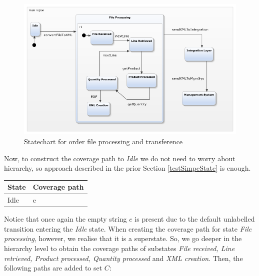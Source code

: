\begin{figure}[htb]
\centering
\includegraphics[width=15cm]{figuras/webEDI}
\caption{\label{fig:webEDI} Statechart for order file processing and transference}
\end{figure}

Now, to construct the coverage path to \textit{Idle} we do not need to worry about hierarchy, so approach described in the prior Section \ref{testSimpeState} is enough.

\begin{center}
\begin{tabular}{| l | l|}

\hline

State & Coverage path \\ \hline

Idle & e \\

\hline
\end{tabular}
\end{center}

Notice that once again the empty string $e$ is present due to the default unlabelled transition entering the \textit{Idle} state.
%
When creating the coverage path for state \textit{File processing}, however, we realise that it is a superstate. So, we go deeper in the hierarchy level to obtain the coverage paths of substates \textit{File received, Line retrieved, Product processed, Quantity processed} and \textit{XML creation}. Then,  the following paths are added to set $C$:

